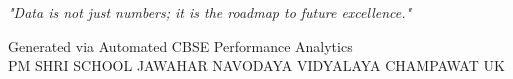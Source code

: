 \documentclass[11pt, a4paper]{article}
\begin{document}
\begin{center}
    
    \vspace{1.5cm}
    
    \textit{\textcolor{textdim}{"Data is not just numbers; it is the roadmap to future excellence."}}
    
    \vspace{1.5cm}
    
    \textcolor{textdim}{\small Generated via Automated CBSE Performance Analytics} \\
    \textcolor{textdim}{\small PM SHRI SCHOOL JAWAHAR NAVODAYA VIDYALAYA CHAMPAWAT UK}
\end{center}

\vspace*{\fill}
\end{document}
